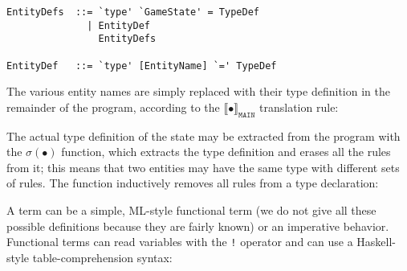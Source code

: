 \begin{lstlisting}
EntityDefs  ::= `type' `GameState' = TypeDef
              | EntityDef
                EntityDefs

EntityDef   ::= `type' [EntityName] `=' TypeDef
\end{lstlisting}

The various entity names are simply replaced with their type definition in the remainder of the program, according to the $\llbracket \bullet \rrbracket_{\mathtt{MAIN}}$ translation rule:


The actual type definition of the state may be extracted from the program with the $\sigma(\bullet)$ function, which extracts the type definition and erases all the rules from it; this means that two entities may have the same type with different sets of rules. The function inductively removes all rules from a type declaration:


A term can be a simple, ML-style functional term (we do not give all these possible definitions because they are fairly known) or an imperative behavior. Functional terms can read variables with the \texttt{!} operator and can use a Haskell-style table-comprehension syntax:

